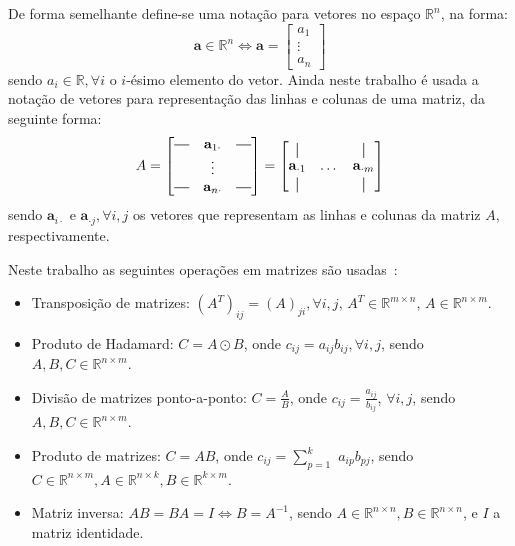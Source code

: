 \documentclass[
    12pt,                %
    oneside,            %
    a4paper,            %
    english,            %
    brazil                %
    ]{abntex2ppgsi}
\newcommand*{\horzbar}{\rule[.5ex]{2.5ex}{0.5pt}}
\newcommand*{\vertbar}{\rule[-1ex]{0.5pt}{2.5ex}}
\begin{document}
De forma semelhante define-se uma notação para vetores no espaço $\mathbb{R}^n$, na forma:
\[
    \mathbf{a} \in \mathbb{R}^n \Leftrightarrow \mathbf{a} = \begin{bmatrix}
                                                                     a_{1}  \\
                                                                     \vdots \\
                                                                     a_{n}
                                                                 \end{bmatrix}
\]
sendo $a_i \in \mathbb{R}, \forall i$ o $i$-ésimo elemento do vetor.
Ainda neste trabalho é usada a notação de vetores para representação das linhas e colunas de uma matriz, da seguinte forma:
\[
    A = \begin{bmatrix}
            \horzbar & \mathbf{a}_{1 \cdot} & \horzbar \\
                     & \vdots               &          \\
            \horzbar & \mathbf{a}_{n \cdot} & \horzbar
        \end{bmatrix}
      = \begin{bmatrix}
            \vertbar             &          & \vertbar             \\
            \mathbf{a}_{\cdot 1} & \dots    & \mathbf{a}_{\cdot m} \\
            \vertbar             &          & \vertbar
        \end{bmatrix}
\]
sendo $\mathbf{a}_{i \cdot}$ e $\mathbf{a}_{\cdot j}, \forall i,j$ os vetores que representam as linhas e colunas da matriz $A$, respectivamente.

Neste trabalho as seguintes operações em matrizes são usadas~\cite{Golub1996}:
\begin{itemize}
    \item Transposição de matrizes: $(A^T)_{ij} = (A)_{ji}, \forall i, j$, $A^T \in \mathbb{R}^{m \times n}$, $A \in \mathbb{R}^{n \times m}$.
    \item Produto de Hadamard: $C=A\odot B$, onde $c_{ij} = a_{ij} b_{ij}, \forall i, j$, sendo $A, B, C \in \mathbb{R}^{n \times m}$.
    \item Divisão de matrizes ponto-a-ponto: $C = \frac{A}{B}$, onde $c_{ij} = \frac{a_{ij}}{b_{ij}}$, $\forall i, j$, sendo $A, B, C \in \mathbb{R}^{n \times m}$.
    \item Produto de matrizes: $C = AB$, onde $c_{ij} = \sum_{p = 1}^k$ $a_{ip} b_{pj}$, sendo $C \in \mathbb{R}^{n \times m}, A \in \mathbb{R}^{n \times k}, B \in \mathbb{R}^{k \times m}$.
    \item Matriz inversa: $AB = BA = I \Leftrightarrow B = A^{-1}$, sendo $A \in \mathbb{R}^{n \times n}, B \in \mathbb{R}^{n \times n}$, e $I$ a matriz identidade.
\end{itemize}
\end{document}
